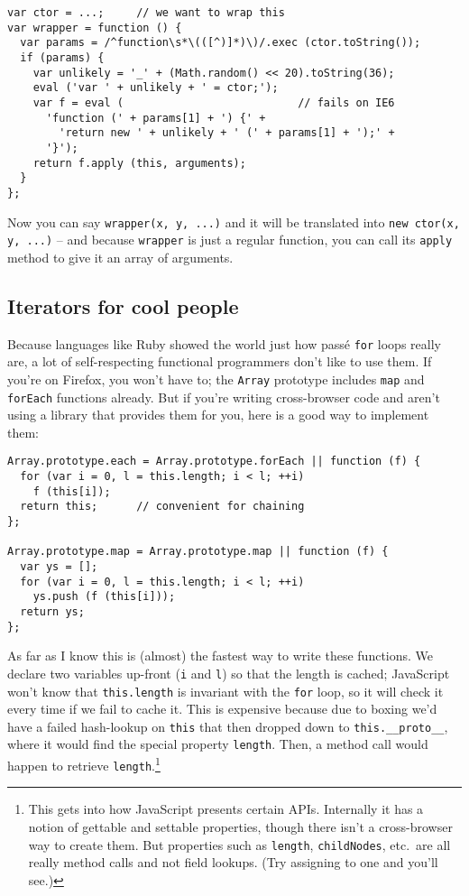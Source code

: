 \documentclass{article}
\begin{document}
\begin{verbatim}
var ctor = ...;     // we want to wrap this
var wrapper = function () {
  var params = /^function\s*\(([^)]*)\)/.exec (ctor.toString());
  if (params) {
    var unlikely = '_' + (Math.random() << 20).toString(36);
    eval ('var ' + unlikely + ' = ctor;');
    var f = eval (                           // fails on IE6
      'function (' + params[1] + ') {' +
        'return new ' + unlikely + ' (' + params[1] + ');' +
      '}');
    return f.apply (this, arguments);
  }
};
\end{verbatim}

    Now you can say {\tt wrapper(x, y, ...)} and it will be translated into {\tt new ctor(x, y, ...)} -- and because {\tt wrapper} is just a regular function, you can call its {\tt apply}
    method to give it an array of arguments.

\subsection {Iterators for cool people}
    Because languages like Ruby showed the world just how pass\'e \verb|for| loops really are, a lot of self-respecting functional programmers don't like to use them. If you're on Firefox, you
    won't have to; the \verb|Array| prototype includes \verb|map| and \verb|forEach| functions already. But if you're writing cross-browser code and aren't using a library that provides them
    for you, here is a good way to implement them:

\begin{verbatim}
Array.prototype.each = Array.prototype.forEach || function (f) {
  for (var i = 0, l = this.length; i < l; ++i)
    f (this[i]);
  return this;      // convenient for chaining
};

Array.prototype.map = Array.prototype.map || function (f) {
  var ys = [];
  for (var i = 0, l = this.length; i < l; ++i)
    ys.push (f (this[i]));
  return ys;
};
\end{verbatim}

    As far as I know this is (almost) the fastest way to write these functions. We declare two variables up-front (\verb|i| and \verb|l|) so that the length is cached; JavaScript won't know
    that \verb|this.length| is invariant with the \verb|for| loop, so it will check it every time if we fail to cache it. This is expensive because due to boxing we'd have a failed hash-lookup
    on \verb|this| that then dropped down to \verb|this.__proto__|, where it would find the special property \verb|length|. Then, a method call would happen to retrieve
    \verb|length|.\footnote{This gets into how JavaScript presents certain APIs. Internally it has a notion of gettable and settable properties, though there isn't a cross-browser way to
    create them. But properties such as {\tt length}, {\tt childNodes}, etc.~are all really method calls and not field lookups. (Try assigning to one and you'll see.)}
\end{document}
